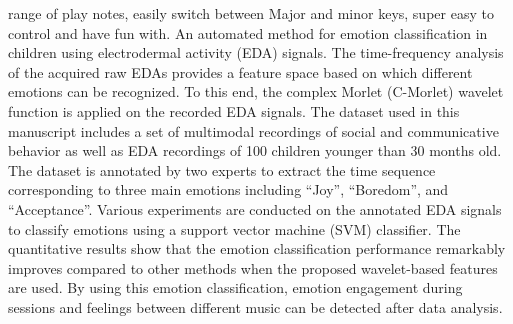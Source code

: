 {	range of play notes, easily switch between Major and minor keys, super easy to control and have
	fun with. 
	An automated method for emotion classification in children using electrodermal activity 
	(EDA) signals. The time-frequency analysis of the acquired raw EDAs provides a feature space based on which 
	different emotions can be recognized. To this end, the complex Morlet (C-Morlet) wavelet function is applied 
	on the recorded EDA signals. The dataset used in this manuscript includes a set of multimodal recordings of 
	social and communicative behavior as well as EDA recordings of 100 children younger than 30 months old. The 
	dataset is annotated by two experts to extract the time sequence corresponding to three main emotions 
	including “Joy”, “Boredom”, and “Acceptance”. Various experiments are 
	conducted on the annotated EDA signals to classify emotions using a support vector machine (SVM) classifier. 
	The quantitative results show that the emotion classification performance remarkably improves compared to 
	other methods when the proposed wavelet-based features are used.
	By using this emotion classification, emotion engagement during sessions and feelings between different
	music can be detected after data analysis.
}
